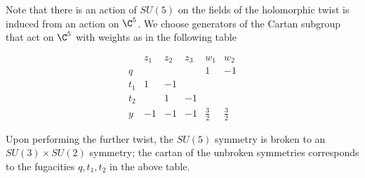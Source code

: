 Note that there is an action of $SU(5)$ on the fields of the holomorphic twist is induced from an action on $\C^5$. We choose generators of the Cartan subgroup that act on $\C^5$ with weights as in the following table

\[\begin{array}{|c|c|c|c|c|c|}
& z_1 & z_2 & z_3 & w_1 & w_2 \\
\hline
q & & & & 1 & -1 \\
t_1 & 1 & -1 & & & \\
t_2 & & 1 & -1 & & \\
y & -1 & -1 & -1 &\frac 3 2 & \frac 3 2
\end{array}\]

Upon performing the further twist, the $SU(5)$ symmetry is broken to an $SU(3)\times SU(2)$ symmetry; the cartan of the unbroken symmetries corresponds to the fugacities $q, t_1, t_2$ in the above table. 

